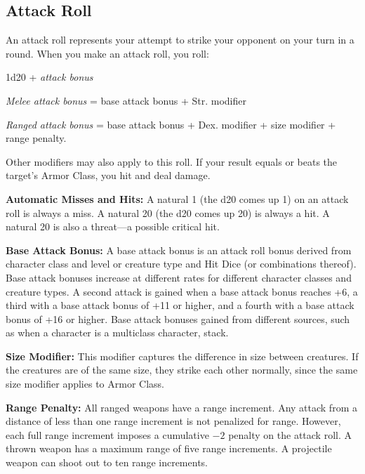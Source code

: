 \subsection{Attack Roll}
An attack roll represents your attempt to strike your opponent on your turn in a round. When you make an attack roll, you roll:

\begin{Formula*}{1d20 + \textit{attack bonus}}
	\item \textit{Melee attack bonus} = base attack bonus + Str. modifier
	\item \textit{Ranged attack bonus} = base attack bonus + Dex. modifier + size modifier + range penalty.
\end{Formula*}

Other modifiers may also apply to this roll. If your result equals or beats the target's Armor Class, you hit and deal damage.

\textbf{Automatic Misses and Hits:} A natural 1 (the d20 comes up 1) on an attack roll is always a miss. A natural 20 (the d20 comes up 20) is always a hit. A natural 20 is also a threat---a possible critical hit.

\textbf{Base Attack Bonus:} A base attack bonus is an attack roll bonus derived from character class and level or creature type and Hit Dice (or combinations thereof). Base attack bonuses increase at different rates for different character classes and creature types. A second attack is gained when a base attack bonus reaches +6, a third with a base attack bonus of +11 or higher, and a fourth with a base attack bonus of +16 or higher. Base attack bonuses gained from different sources, such as when a character is a multiclass character, stack.

\textbf{Size Modifier:} This modifier captures the difference in size between creatures. If the creatures are of the same size, they strike each other normally, since the same size modifier applies to Armor Class.


\textbf{Range Penalty:} All ranged weapons have a range increment. Any attack from a distance of less than one range increment is not penalized for range. However, each full range increment imposes a cumulative $-2$ penalty on the attack roll. A thrown weapon has a maximum range of five range increments. A projectile weapon can shoot out to ten range increments.